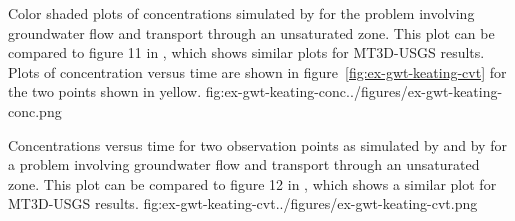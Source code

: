 \begin{StandardFigure}{
                                     Color shaded plots of concentrations simulated by \mf for the \cite{keating2009stable} problem involving groundwater flow and transport through an unsaturated zone.  This plot can be compared to figure 11 in \cite{mt3dusgs}, which shows similar plots for MT3D-USGS results.  Plots of concentration versus time are shown in figure~\ref{fig:ex-gwt-keating-cvt} for the two points shown in yellow.
                                     }{fig:ex-gwt-keating-conc}{../figures/ex-gwt-keating-conc.png}
\end{StandardFigure}                                  

\begin{StandardFigure}{
                                     Concentrations versus time for two observation points as simulated by \mf and by \cite{keating2009stable} for a problem involving groundwater flow and transport through an unsaturated zone.  This plot can be compared to figure 12 in \cite{mt3dusgs}, which shows a similar plot for MT3D-USGS results.
                                     }{fig:ex-gwt-keating-cvt}{../figures/ex-gwt-keating-cvt.png}
\end{StandardFigure}                                  
